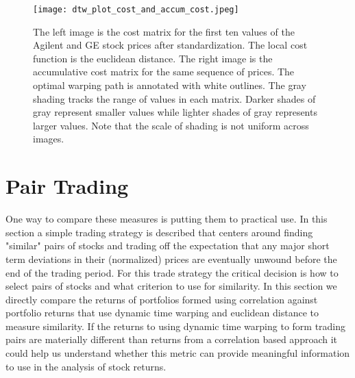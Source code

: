 \documentclass[12pt]{article}
\begin{document}
\begin{figure}
    \centering
    \texttt{[image: dtw\_plot\_cost\_and\_accum\_cost.jpeg]}
    \caption{The left image is the cost matrix for the first ten values of the Agilent and GE stock prices after standardization. The local cost function is the euclidean distance. The right image is the accumulative cost matrix for the same sequence of prices. The optimal warping path is annotated with white outlines. The gray shading tracks the range of values in each matrix. Darker shades of gray represent smaller values while lighter shades of gray represents larger values. Note that the scale of shading is not uniform across images.}
    \label{fig:dtw_plot_cost_and_accum_cost}
\end{figure}



\pagebreak


\section{Pair Trading} \label{sec:PairTrading}


One way to compare these measures is putting them to practical use. In this section a simple trading strategy is described that centers around finding "similar" pairs of stocks and trading off the expectation that any major short term deviations in their (normalized) prices are eventually unwound before the end of the trading period. For this trade strategy the critical decision is how to select pairs of stocks and what criterion to use for similarity. In this section we directly compare the returns of portfolios formed using correlation against portfolio returns that use dynamic time warping and euclidean distance to measure similarity. If the returns to using dynamic time warping to form trading pairs are materially different than returns from a correlation based approach it could help us understand whether this metric can provide meaningful information to use in the analysis of stock returns.
\end{document}
